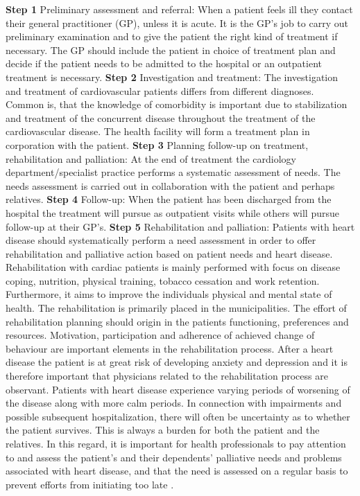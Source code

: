 \textbf{Step 1} Preliminary assessment and referral: When a patient feels ill they contact their general practitioner (GP), unless it is acute. It is the GP's job to carry out preliminary examination and to give the patient the right kind of treatment if necessary. The GP should include the patient in choice of treatment plan and decide if the patient needs to be admitted to the hospital or an outpatient treatment is necessary. 
\newline
\newline
\textbf{Step 2} Investigation and treatment: The investigation and treatment of cardiovascular patients differs from different diagnoses. Common is, that the knowledge of comorbidity is important due to stabilization and treatment of the concurrent disease throughout the treatment of the cardiovascular disease. The health facility will form a treatment plan in corporation with the patient. 
\newline
\newline
\textbf{Step 3} Planning follow-up on treatment, rehabilitation and palliation: At the end of treatment the cardiology department/specialist practice performs a systematic assessment of needs. The needs assessment is carried out in collaboration with the patient and perhaps relatives. 
\newline
\newline
\textbf{Step 4} Follow-up: When the patient has been discharged from the hospital the treatment will pursue as outpatient visits while others will pursue follow-up at their GP's. 
\newline
\newline
\textbf{Step 5} Rehabilitation and palliation: Patients with heart disease should systematically perform a need assessment in order to offer rehabilitation and palliative action based on patient needs and heart disease. Rehabilitation with cardiac patients is mainly performed with focus on disease coping, nutrition, physical training, tobacco cessation and work retention. Furthermore, it aims to improve the individuals physical and mental state of health. The rehabilitation is primarily placed in the municipalities. The effort of rehabilitation planning should origin in the patients functioning, preferences and resources. Motivation, participation and adherence of achieved change of behaviour are important elements in the rehabilitation process. After a heart disease the patient is at great risk of developing anxiety and depression and it is therefore important that physicians related to the rehabilitation process are observant. 
\newline
\newline
Patients with heart disease experience varying periods of worsening of the disease along with more calm periods. In connection with impairments and possible subsequent hospitalization, there will often be uncertainty as to whether the patient survives. This is always a burden for both the patient and the relatives. In this regard, it is important for health professionals to pay attention to and assess the patient's and their dependents' palliative needs and problems associated with heart disease, and that the need is assessed on a regular basis to prevent efforts from initiating too late \cite{behandlingsforlob}.


